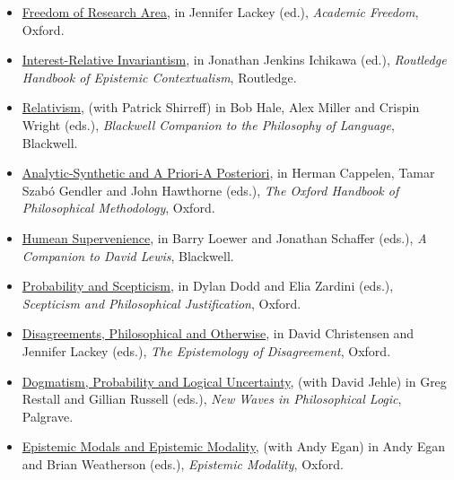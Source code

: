 \documentclass[
  10pt,
  letterpaper,
  DIV=11,
  numbers=noendperiod,
  twoside]{scrartcl}
\providecommand{\tightlist}{%
  \setlength{\itemsep}{0pt}\setlength{\parskip}{0pt}}\usepackage{longtable,booktabs,array}
\begin{document}
\begin{itemize}
\tightlist
\item
  \href{https://brian.weatherson.org/quarto/posts/fora/freedom-of-research-area.html}{Freedom
  of Research Area}, in Jennifer Lackey (ed.), \emph{Academic Freedom},
  Oxford.
\item
  \href{https://brian.weatherson.org/quarto/posts/iri/interest-relative-invariantism.html}{Interest-Relative
  Invariantism}, in Jonathan Jenkins Ichikawa (ed.), \emph{Routledge
  Handbook of Epistemic Contextualism}, Routledge.
\item
  \href{https://brian.weatherson.org/quarto/posts/relativism/relativism.html}{Relativism},
  (with Patrick Shirreff) in Bob Hale, Alex Miller and Crispin Wright
  (eds.), \emph{Blackwell Companion to the Philosophy of Language},
  Blackwell.
\item
  \href{https://brian.weatherson.org/quarto/posts/synthetic/analytic-synthetic-and-a-priori-a-posteriori.html}{Analytic-Synthetic
  and A Priori-A Posteriori}, in Herman Cappelen, Tamar Szabó Gendler
  and John Hawthorne (eds.), \emph{The Oxford Handbook of Philosophical
  Methodology}, Oxford.
\item
  \href{https://brian.weatherson.org/quarto/posts/humsup/humean-supervenience.html}{Humean
  Supervenience}, in Barry Loewer and Jonathan Schaffer (eds.), \emph{A
  Companion to David Lewis}, Blackwell.
\item
  \href{https://brian.weatherson.org/quarto/posts/pas/probability-and-scepticism.html}{Probability
  and Scepticism}, in Dylan Dodd and Elia Zardini (eds.),
  \emph{Scepticism and Philosophical Justification}, Oxford.
\item
  \href{https://brian.weatherson.org/quarto/posts/dpao/disagreements-philosophical-and-otherwise.html}{Disagreements,
  Philosophical and Otherwise}, in David Christensen and Jennifer Lackey
  (eds.), \emph{The Epistemology of Disagreement}, Oxford.
\item
  \href{https://brian.weatherson.org/quarto/posts/dplu/dogmatism-probability-and-logical-uncertainty.html}{Dogmatism,
  Probability and Logical Uncertainty}, (with David Jehle) in Greg
  Restall and Gillian Russell (eds.), \emph{New Waves in Philosophical
  Logic}, Palgrave.
\item
  \href{https://brian.weatherson.org/quarto/posts/epistemic-modals/epistemic-modals-and-epistemic-modality.html}{Epistemic
  Modals and Epistemic Modality}, (with Andy Egan) in Andy Egan and
  Brian Weatherson (eds.), \emph{Epistemic Modality}, Oxford.

\end{itemize}
\end{document}
